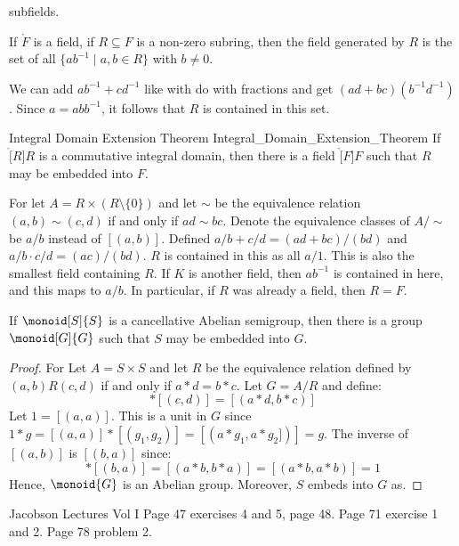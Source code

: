 \documentclass{article}                                                        %
\begin{document}
                subfields.
                \begin{theorem}
                    If $\ring{F}$ is a field, if $R\subseteq{F}$ is a non-zero
                    subring, then the field generated by $R$ is the set of all
                    $\{ab^{\minus{1}}\;|\;a,b\in{R}\}$ with $b\ne{0}$.
                \end{theorem}
                We can add $ab^{\minus{1}}+cd^{\minus{1}}$ like with do with
                fractions and get $(ad+bc)(b^{\minus{1}}d^{\minus{1}})$.
                Since $a=abb^{\minus{1}}$, it follows that $R$ is contained in
                this set.
                \begin{ftheorem}{Integral Domain Extension Theorem}
                                {Integral_Domain_Extension_Theorem}
                    If $\ring[R]{R}$ is a commutative integral domain, then
                    there is a field $\ring[F]{F}$ such that $R$ may be
                    embedded into $F$.
                \end{ftheorem}
                \begin{bproof}
                    For let $A=R\times(R\setminus\{0\})$ and let $\sim$ be the
                    equivalence relation $(a,b)\sim(c,d)$ if and only if
                    $ad\sim{b}c$. Denote the equivalence classes of
                    $A/\sim$ be $a/b$ instead of $[(a,b)]$. Defined
                    $a/b+c/d=(ad+bc)/(bd)$ and $a/b\cdot{c}/d=(ac)/(bd)$.
                    $R$ is contained in this as all $a/1$. This is also the
                    smallest field containing $R$. If $K$ is another field,
                    then $ab^{\minus{1}}$ is contained in here, and this maps
                    to $a/b$. In particular, if $R$ was already a field, then
                    $R=F$.
                \end{bproof}
                \begin{theorem}
                    If $\monoid[S]{S}$ is a cancellative Abelian semigroup, then
                    there is a group $\monoid[G]{G}$ such that $S$ may be
                    embedded into $G$.
                \end{theorem}
                \begin{proof}
                    For Let $A=S\times{S}$ and let $R$ be the equivalence
                    relation defined by $(a,b)R(c,d)$ if and only if
                    $a*d=b*c$. Let $G=A/R$ and define:
                    \begin{equation}
                        [(a,b)]*[(c,d)]=[(a*d,b*c)]
                    \end{equation}
                    Let $1=[(a,a)]$. This is a unit in $G$ since
                    $1*g=[(a,a)]*[(g_{1},g_{2})]=[(a*g_{1},a*g_{2}])]=g$.
                    The inverse of $[(a,b)]$ is $[(b,a)]$ since:
                    \begin{equation}
                        [(a,b)]*[(b,a)]=[(a*b,b*a)]=[(a*b,a*b)]=1
                    \end{equation}
                    Hence, $\monoid{G}$ is an Abelian group. Moreover, $S$
                    embeds into $G$ as.
                \end{proof}
    \par\hfill\par
    Jacobson Lectures Vol I Page 47 exercises 4 and 5, page 48. Page 71
    exercise 1 and 2. Page 78 problem 2.
\end{document}
